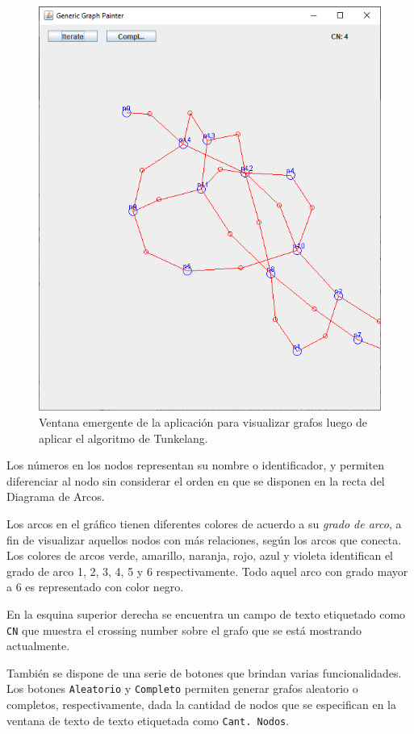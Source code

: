 	\begin{figure}
		\centering
		\includegraphics[scale=0.7]{imagenes/aplicacion_fuerzas.png}
		\caption{Ventana emergente de la aplicación para visualizar grafos luego de aplicar el algoritmo de Tunkelang.}
		\label{fig2:aplicacion}
	\end{figure}
Los números en los nodos representan su nombre o identificador,  y permiten diferenciar al nodo sin considerar el orden en que se disponen en la recta del Diagrama de Arcos.

Los arcos en el gráfico tienen diferentes colores de acuerdo a su {\em grado de arco}, a fin   de visualizar aquellos nodos con más relaciones, según los arcos que conecta. Los colores de arcos verde, amarillo, naranja, rojo, azul y violeta identifican el grado de arco 1, 2, 3, 4, 5 y 6 respectivamente. Todo aquel arco con grado mayor a 6 es representado con color negro.

En la esquina superior derecha se encuentra un campo de texto etiquetado como \texttt{CN} que muestra el crossing number sobre el grafo que se está mostrando actualmente.


También se dispone de una serie de botones que brindan varias funcionalidades. Los botones \texttt{Aleatorio} y \texttt{Completo} permiten generar grafos aleatorio o completos, respectivamente, dada la cantidad de nodos que se especifican en la ventana de texto de texto etiquetada como \texttt{Cant. Nodos}. 


